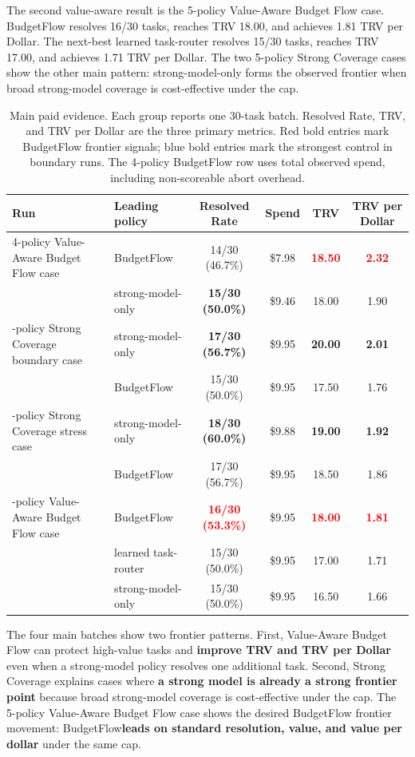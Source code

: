 \documentclass[sigconf,review,anonymous]{acmart}
\newcommand{\method}{BudgetFlow\xspace}
\newcommand{\trv}{TRV\xspace}
\newcommand{\pos}[1]{\textcolor{red}{\textbf{#1}}}
\newcommand{\ctrl}[1]{\textcolor{bfblue}{\textbf{#1}}}
\begin{document}
The second value-aware result is the 5-policy Value-Aware Budget Flow case. \method resolves 16/30 tasks, reaches \trv 18.00, and achieves 1.81 \trv per Dollar. The next-best learned task-router resolves 15/30 tasks, reaches \trv 17.00, and achieves 1.71 \trv per Dollar. The two 5-policy Strong Coverage cases show the other main pattern: strong-model-only forms the observed frontier when broad strong-model coverage is cost-effective under the cap.

\begin{table}[t]
\centering
\small
\begin{tabular}{llcccc}
\toprule
Run & Leading policy & Resolved Rate & Spend & TRV & TRV per Dollar \\
\midrule
4-policy Value-Aware Budget Flow case & \method & 14/30 (46.7\%) & \$7.98 & \pos{18.50} & \pos{2.32} \\
 & strong-model-only & \ctrl{15/30 (50.0\%)} & \$9.46 & 18.00 & 1.90 \\
\addlinespace
5-policy Strong Coverage boundary case & strong-model-only & \ctrl{17/30 (56.7\%)} & \$9.95 & \ctrl{20.00} & \ctrl{2.01} \\
 & \method & 15/30 (50.0\%) & \$9.95 & 17.50 & 1.76 \\
\addlinespace
5-policy Strong Coverage stress case & strong-model-only & \ctrl{18/30 (60.0\%)} & \$9.88 & \ctrl{19.00} & \ctrl{1.92} \\
 & \method & 17/30 (56.7\%) & \$9.95 & 18.50 & 1.86 \\
\addlinespace
5-policy Value-Aware Budget Flow case & \method & \pos{16/30 (53.3\%)} & \$9.95 & \pos{18.00} & \pos{1.81} \\
 & learned task-router & 15/30 (50.0\%) & \$9.95 & 17.00 & 1.71 \\
 & strong-model-only & 15/30 (50.0\%) & \$9.95 & 16.50 & 1.66 \\
\bottomrule
\end{tabular}
\caption{Main paid evidence. Each group reports one 30-task batch. Resolved Rate, \trv, and \trv per Dollar are the three primary metrics. Red bold entries mark BudgetFlow frontier signals; blue bold entries mark the strongest control in boundary runs. The 4-policy BudgetFlow row uses total observed spend, including non-scoreable abort overhead.}
\label{tab:main-evidence}
\end{table}

The four main batches show two frontier patterns. First, Value-Aware Budget Flow can protect high-value tasks and \textbf{improve \trv and \trv per Dollar} even when a strong-model policy resolves one additional task. Second, Strong Coverage explains cases where \textbf{a strong model is already a strong frontier point} because broad strong-model coverage is cost-effective under the cap. The 5-policy Value-Aware Budget Flow case shows the desired \method frontier movement: \method \textbf{leads on standard resolution, value, and value per dollar} under the same cap.
\end{document}
